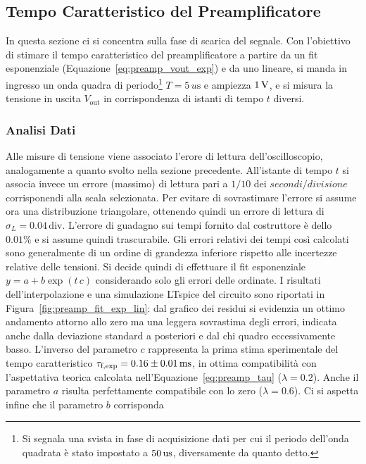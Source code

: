 \subsection{Tempo Caratteristico del Preamplificatore}\label{sec:preamp_ft}
In questa sezione ci si concentra sulla fase di scarica del segnale. Con l'obiettivo di stimare
il tempo caratteristico del preamplificatore a partire da un fit esponenziale (Equazione~\ref{eq:preamp_vout_exp}) e
da uno lineare, si manda in ingresso un onda quadra di periodo\footnote{Si segnala una svista in fase di acquisizione dati per cui il periodo dell'onda quadrata è stato impostato a $50\us$, diversamente da quanto detto.}  $T=5\,\si{u\s}$ e ampiezza $1\,\si{\volt}$, e si misura la tensione in uscita $V_{\text{out}}$ in corrispondenza di istanti di tempo $t$ diversi.

\subsubsection{Analisi Dati}\label{sec:preamp_ft_analisi}
Alle misure di tensione viene associato l'erore di lettura dell'oscilloscopio,
analogamente a quanto svolto nella sezione precedente. All'istante di tempo
$t$ si associa invece un errore (massimo) di lettura pari a $1/10$ dei $secondi/divisione$ corrisponendi alla scala selezionata. Per evitare di
sovrastimare l'errore si assume ora una distribuzione triangolare, ottenendo quindi un errore di lettura di $\sigma_{L}=0.04\,\text{div}$. L'errore di guadagno sui
tempi fornito dal costruttore è dello $0.01\%$ e si assume quindi trascurabile.
Gli errori relativi dei tempi così calcolati sono generalmente di un ordine di grandezza inferiore rispetto alle incertezze relative delle tensioni. Si decide quindi
di effettuare il fit esponenziale $y=a+b \exp(t\,c)$ considerando solo gli errori delle ordinate. I risultati dell'interpolazione e una simulazione
LTspice del circuito sono riportati in
Figura~\ref{fig:preamp_fit_exp_lin}: dal grafico dei residui si evidenzia un ottimo andamento
attorno allo zero ma una leggera sovrastima degli errori, indicata anche
dalla deviazione standard a posteriori e dal chi quadro eccessivamente basso.
L'inverso del parametro $c$ rappresenta la prima stima sperimentale del
tempo caratteristico $\tau_{\text f,\text{exp}}= 0.16\pm 0.01\,\si{m\s}$, in ottima compatibilità con l'aspettativa teorica calcolata nell'Equazione~\ref{eq:preamp_tau} ($\lambda=0.2$).
Anche il parametro $a$ risulta perfettamente compatibile con lo zero
($\lambda=0.6$). Ci si aspetta infine che il parametro $b$ corrisponda
